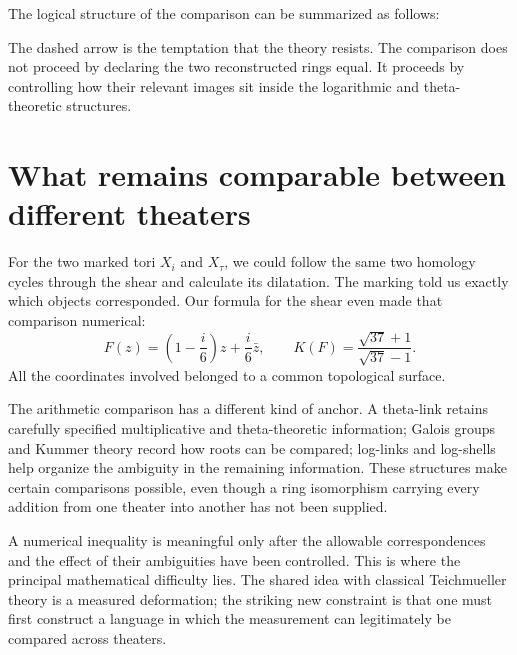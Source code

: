 The logical structure of the comparison can be summarized as follows:
\begin{center}
\end{center}
The dashed arrow is the temptation that the theory resists.  The comparison does not proceed by declaring the two reconstructed rings equal.  It proceeds by controlling how their relevant images sit inside the logarithmic and theta-theoretic structures.

\section{What remains comparable between different theaters}

For the two marked tori $X_i$ and $X_\tau$, we could follow the same two homology cycles through the shear and calculate its dilatation. The marking told us exactly which objects corresponded. Our formula for the shear even made that comparison numerical:
\[
 F(z)=\left(1-\frac i6\right)z+\frac i6\bar z,
 \qquad K(F)=\frac{\sqrt{37}+1}{\sqrt{37}-1}.
\]
All the coordinates involved belonged to a common topological surface.

The arithmetic comparison has a different kind of anchor. A theta-link retains carefully specified multiplicative and theta-theoretic information; Galois groups and Kummer theory record how roots can be compared; log-links and log-shells help organize the ambiguity in the remaining information. These structures make certain comparisons possible, even though a ring isomorphism carrying every addition from one theater into another has not been supplied.

A numerical inequality is meaningful only after the allowable correspondences and the effect of their ambiguities have been controlled. This is where the principal mathematical difficulty lies. The shared idea with classical Teichmueller theory is a measured deformation; the striking new constraint is that one must first construct a language in which the measurement can legitimately be compared across theaters.
